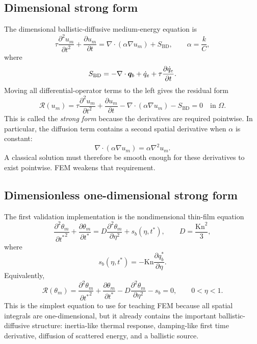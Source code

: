 \documentclass[11pt]{article}
\begin{document}
\subsection{Dimensional strong form}
The dimensional ballistic-diffusive medium-energy equation is
\begin{equation}
    \tau\frac{\partial^2u_m}{\partial t^2}
    +\frac{\partial u_m}{\partial t}
    =\nabla\cdot\left(\alpha\nabla u_m\right)+S_{\mathrm{BD}},
    \qquad
    \alpha=\frac{k}{C},
    \label{eq:fem_dimensional_strong_original}
\end{equation}
where
\begin{equation}
    S_{\mathrm{BD}}
    =-\nabla\cdot\bm{q}_b
    +\dot q_e+\tau\frac{\partial \dot q_e}{\partial t}.
    \label{eq:fem_sbd_dimensional}
\end{equation}
Moving all differential-operator terms to the left gives the residual form
\begin{equation}
    \boxed{
    \mathcal{R}(u_m)
    =\tau\frac{\partial^2u_m}{\partial t^2}
    +\frac{\partial u_m}{\partial t}
    -\nabla\cdot(\alpha\nabla u_m)
    -S_{\mathrm{BD}}
    =0
    \quad \text{in }\Omega.}
    \label{eq:fem_dimensional_residual}
\end{equation}
This is called the \emph{strong form} because the derivatives are required pointwise. In particular, the diffusion term contains a second spatial derivative when \(\alpha\) is constant:
\begin{equation}
    \nabla\cdot(\alpha\nabla u_m)=\alpha\nabla^2u_m.
\end{equation}
A classical solution must therefore be smooth enough for these derivatives to exist pointwise. FEM weakens that requirement.

\subsection{Dimensionless one-dimensional strong form}
The first validation implementation is the nondimensional thin-film equation
\begin{equation}
    \frac{\partial^2\theta_m}{\partial {t^*}^2}
    +\frac{\partial\theta_m}{\partial t^*}
    =D\frac{\partial^2\theta_m}{\partial\eta^2}
    +s_b(\eta,t^*),
    \qquad
    D=\frac{\mathrm{Kn}^2}{3},
    \label{eq:fem_1d_bd_strong}
\end{equation}
where
\begin{equation}
    s_b(\eta,t^*)=-\mathrm{Kn}\frac{\partial q_b^*}{\partial\eta}.
    \label{eq:fem_1d_ballistic_source}
\end{equation}
Equivalently,
\begin{equation}
    \boxed{
    \mathcal{R}(\theta_m)
    =\frac{\partial^2\theta_m}{\partial {t^*}^2}
    +\frac{\partial\theta_m}{\partial t^*}
    -D\frac{\partial^2\theta_m}{\partial\eta^2}
    -s_b
    =0,
    \qquad 0<\eta<1.}
    \label{eq:fem_1d_residual}
\end{equation}
This is the simplest equation to use for teaching FEM because all spatial integrals are one-dimensional, but it already contains the important ballistic-diffusive structure: inertia-like thermal response, damping-like first time derivative, diffusion of scattered energy, and a ballistic source.
\end{document}
